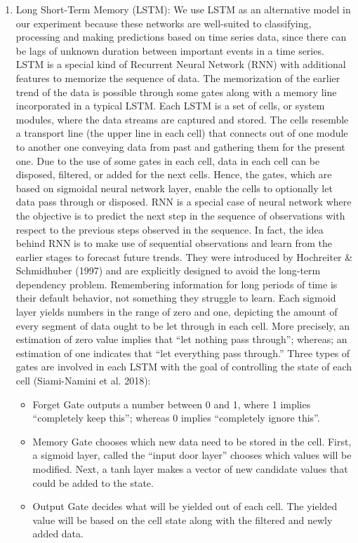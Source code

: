 \documentclass[12pt,italian, twoside]{report}
\begin{document}
\begin{enumerate}
\item Long Short-Term Memory (LSTM): We use LSTM as an alternative model in our experiment because these networks are well-suited to classifying, processing and making predictions based on time series data, since there can be lags of unknown duration between important events in a time series. LSTM is a special kind of Recurrent Neural Network (RNN) with additional features to memorize the sequence of data. The memorization of the earlier trend of the data is possible through some gates along with a memory line incorporated in a typical LSTM. Each LSTM is a set of cells, or system modules, where the data streams are captured and stored. The cells resemble a transport line (the upper line in each cell) that connects out of one module to another one conveying data from past and gathering them for the present one. Due to the use of some gates in each cell, data in each cell can be disposed, filtered, or added for the next cells. Hence, the gates, which are based on sigmoidal neural network layer, enable the cells to optionally let data pass through or disposed. RNN is a special case of neural network where the objective is to predict the next step in the sequence of observations with respect to the previous steps observed in the sequence. In fact, the idea behind RNN is to make use of sequential observations and learn from the earlier stages to forecast future trends. They were introduced by Hochreiter \& Schmidhuber (1997) and are explicitly designed to avoid the long-term dependency problem. Remembering information for long periods of time is their default behavior, not something they struggle to learn. Each sigmoid layer yields numbers in the range of zero and one, depicting the amount of every segment of data ought to be let through in each cell. More precisely, an estimation of zero value implies that “let nothing pass through”; whereas; an estimation of one indicates that “let everything pass through.” Three types of gates are involved in each LSTM with the goal of controlling the state of each cell (Siami-Namini et al. 2018): 
\begin{itemize}
      \item Forget Gate outputs a number between 0 and 1, where 1 implies “completely keep this”; whereas 0 implies “completely ignore this”.
      \item Memory Gate chooses which new data need to be stored in the cell. First, a sigmoid layer, called the “input door layer” chooses which values will be modified. Next, a tanh layer makes a vector of new candidate values that could be added to the state. 
      \item Output Gate decides what will be yielded out of each cell. The yielded value will be based on the cell state along with the filtered and newly added data.
     \end{itemize}
    
\end{enumerate}
\end{document}
